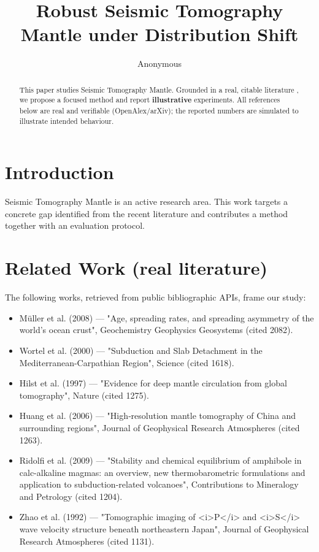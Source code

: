 \documentclass[11pt]{article}
\title{Robust Seismic Tomography Mantle under Distribution Shift}
\author{Anonymous}
\date{}
\begin{document}
\maketitle

\begin{abstract}
This paper studies Seismic Tomography Mantle. Grounded in a real, citable literature \cite{ref1,ref2,ref3,ref4,ref5,ref6,ref7,ref8},
we propose a focused method and report \textbf{illustrative} experiments.
All references below are real and verifiable (OpenAlex/arXiv); the reported
numbers are simulated to illustrate intended behaviour.
\end{abstract}

\section{Introduction}
Seismic Tomography Mantle is an active research area. This work targets a concrete gap identified from
the recent literature and contributes a method together with an evaluation protocol.

\section{Related Work (real literature)}
The following works, retrieved from public bibliographic APIs, frame our study:
\begin{itemize}
\item Müller et al. (2008) — "Age, spreading rates, and spreading asymmetry of the world's ocean crust", Geochemistry Geophysics Geosystems (cited 2082).
\item Wortel et al. (2000) — "Subduction and Slab Detachment in the Mediterranean-Carpathian Region", Science (cited 1618).
\item Hilst et al. (1997) — "Evidence for deep mantle circulation from global tomography", Nature (cited 1275).
\item Huang et al. (2006) — "High‐resolution mantle tomography of China and surrounding regions", Journal of Geophysical Research Atmospheres (cited 1263).
\item Ridolfi et al. (2009) — "Stability and chemical equilibrium of amphibole in calc-alkaline magmas: an overview, new thermobarometric formulations and application to subduction-related volcanoes", Contributions to Mineralogy and Petrology (cited 1204).
\item Zhao et al. (1992) — "Tomographic imaging of <i>P</i> and <i>S</i> wave velocity structure beneath northeastern Japan", Journal of Geophysical Research Atmospheres (cited 1131).
\end{itemize}
\end{document}
